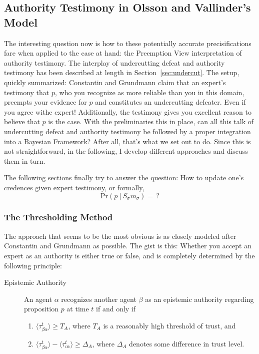 \documentclass[11pt, a4paper]{scrartcl}
\newcommand{\Ss}{S_{\sigma}}
\newcommand{\given}[1][]{\:#1\vert\:}
\newcommand{\Sm}{\Ss{}m_\sigma}
\renewcommand{\Pr}{\text{Pr}}
\begin{document}
\subsection{Authority Testimony in Olsson and Vallinder's Model}

The interesting question now is how to these potentially accurate precisifications fare when applied to the case at hand: the Preemption View interpretation of authority testimony. The interplay of undercutting defeat and authority testimony has been described at length in Section~\ref{sec:undercut}. The setup, quickly summarized: Constantin and Grundmann claim that an expert's testimony that $p$, who you recognize as more reliable than you in this domain, preempts your evidence for $p$ and constitutes an undercutting defeater. Even if you agree withe expert! Additionally, the testimony gives you excellent reason to believe that $p$ is the case.  
With the preliminaries this in place, can all this talk of undercutting defeat and authority testimony be followed by a proper integration into a Bayesian Framework? After all, that's what we set out to do. Since this is not straightforward, in the following, I develop different approaches and discuss them in turn.

The following sections finally try to answer the question: How to update one's credences given expert testimony, or formally, 
\[
    \Pr(p \given \Sm) =\,?
\]
\subsubsection{The Thresholding Method}

The approach that seems to be the most obvious is as closely modeled after Constantin and Grundmann as possible. The gist is this: Whether you accept an expert as an authority is either true or false, and is completely determined by the following principle: 

\begin{description} 
    \item[Epistemic Authority] An agent $\alpha$ recognizes another agent $\beta$ as an epistemic authority regarding proposition $p$ at time $t$ if and only if  
    \begin{enumerate}[label= (\roman*)]
        \item $\langle \tau^t_{\beta\alpha} \rangle \geqslant T_A$, where $T_A$ is a reasonably high threshold of trust, and
        \item $\langle \tau^t_{\beta\alpha} \rangle - \langle \tau^t_{\iota\alpha} \rangle \geqslant \Delta_A$, where $\Delta_A$ denotes some difference in trust level.
    \end{enumerate}
\end{description}
\end{document}
